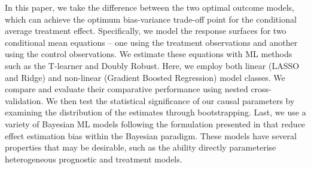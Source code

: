 \documentclass[12pt, a4paper]{article}
\begin{document}
In this paper, we take the difference between the two optimal outcome models,
which can achieve the optimum bias-variance trade-off point for the conditional
average treatment effect. Specifically, we model the response surfaces for two
conditional mean equations -- one using the treatment observations and another
using the control observations. We estimate these equations with ML methods
such as the T-learner and Doubly Robust. Here, we employ both linear (LASSO and
Ridge) and non-linear (Gradient Boosted Regression) model classes. We compare
and evaluate their comparative performance using nested cross-validation. We
then test the statistical significance of our causal parameters by examining
the distribution of the estimates through bootstrapping. Last, we use a variety
of Bayesian ML models following the formulation presented in \citet{hahn2020}
that reduce effect estimation bias within the Bayesian paradigm. These models
have several properties that may be desirable, such as the ability directly
parameterise heterogeneous prognostic and treatment models.
\end{document}
